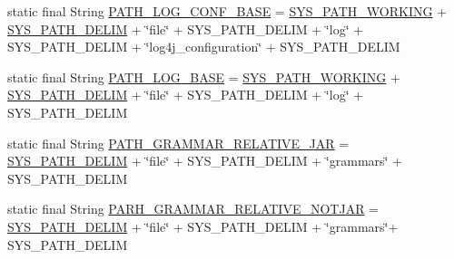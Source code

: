 \begin{DoxyCompactItemize}
\item 
static final String \hyperlink{classit_1_1emarolab_1_1cagg_1_1debugging_1_1DebuggingDefaults_a234dc33c418c2f57b65a6df9b8dee986}{P\-A\-T\-H\-\_\-\-L\-O\-G\-\_\-\-C\-O\-N\-F\-\_\-\-B\-A\-S\-E} = \hyperlink{classit_1_1emarolab_1_1cagg_1_1debugging_1_1DebuggingDefaults_ac2710a46c5c4c629928170fa5e90095d}{S\-Y\-S\-\_\-\-P\-A\-T\-H\-\_\-\-W\-O\-R\-K\-I\-N\-G} + \hyperlink{classit_1_1emarolab_1_1cagg_1_1debugging_1_1DebuggingDefaults_a7c9d7fb448feba26f1848cd81cedbc3f}{S\-Y\-S\-\_\-\-P\-A\-T\-H\-\_\-\-D\-E\-L\-I\-M} + \char`\"{}file\char`\"{} + S\-Y\-S\-\_\-\-P\-A\-T\-H\-\_\-\-D\-E\-L\-I\-M + \char`\"{}log\char`\"{} + S\-Y\-S\-\_\-\-P\-A\-T\-H\-\_\-\-D\-E\-L\-I\-M + \char`\"{}log4j\-\_\-configuration\char`\"{} + S\-Y\-S\-\_\-\-P\-A\-T\-H\-\_\-\-D\-E\-L\-I\-M
\item 
static final String \hyperlink{classit_1_1emarolab_1_1cagg_1_1debugging_1_1DebuggingDefaults_a23849ccb6a25d25160066f5fa24b8e02}{P\-A\-T\-H\-\_\-\-L\-O\-G\-\_\-\-B\-A\-S\-E} = \hyperlink{classit_1_1emarolab_1_1cagg_1_1debugging_1_1DebuggingDefaults_ac2710a46c5c4c629928170fa5e90095d}{S\-Y\-S\-\_\-\-P\-A\-T\-H\-\_\-\-W\-O\-R\-K\-I\-N\-G} + \hyperlink{classit_1_1emarolab_1_1cagg_1_1debugging_1_1DebuggingDefaults_a7c9d7fb448feba26f1848cd81cedbc3f}{S\-Y\-S\-\_\-\-P\-A\-T\-H\-\_\-\-D\-E\-L\-I\-M} + \char`\"{}file\char`\"{} + S\-Y\-S\-\_\-\-P\-A\-T\-H\-\_\-\-D\-E\-L\-I\-M + \char`\"{}log\char`\"{} + S\-Y\-S\-\_\-\-P\-A\-T\-H\-\_\-\-D\-E\-L\-I\-M
\item 
static final String \hyperlink{classit_1_1emarolab_1_1cagg_1_1debugging_1_1DebuggingDefaults_ae6ad1a59b49a5036e0d030c6bb336062}{P\-A\-T\-H\-\_\-\-G\-R\-A\-M\-M\-A\-R\-\_\-\-R\-E\-L\-A\-T\-I\-V\-E\-\_\-\-J\-A\-R} = \hyperlink{classit_1_1emarolab_1_1cagg_1_1debugging_1_1DebuggingDefaults_a7c9d7fb448feba26f1848cd81cedbc3f}{S\-Y\-S\-\_\-\-P\-A\-T\-H\-\_\-\-D\-E\-L\-I\-M} + \char`\"{}file\char`\"{} + S\-Y\-S\-\_\-\-P\-A\-T\-H\-\_\-\-D\-E\-L\-I\-M + \char`\"{}grammars\char`\"{} + S\-Y\-S\-\_\-\-P\-A\-T\-H\-\_\-\-D\-E\-L\-I\-M
\item 
static final String \hyperlink{classit_1_1emarolab_1_1cagg_1_1debugging_1_1DebuggingDefaults_a325c9fa4713048139bba6cf3ec933424}{P\-A\-R\-H\-\_\-\-G\-R\-A\-M\-M\-A\-R\-\_\-\-R\-E\-L\-A\-T\-I\-V\-E\-\_\-\-N\-O\-T\-J\-A\-R} = \hyperlink{classit_1_1emarolab_1_1cagg_1_1debugging_1_1DebuggingDefaults_a7c9d7fb448feba26f1848cd81cedbc3f}{S\-Y\-S\-\_\-\-P\-A\-T\-H\-\_\-\-D\-E\-L\-I\-M} + \char`\"{}file\char`\"{} + S\-Y\-S\-\_\-\-P\-A\-T\-H\-\_\-\-D\-E\-L\-I\-M + \char`\"{}grammars\char`\"{}+ S\-Y\-S\-\_\-\-P\-A\-T\-H\-\_\-\-D\-E\-L\-I\-M

\end{DoxyCompactItemize}
